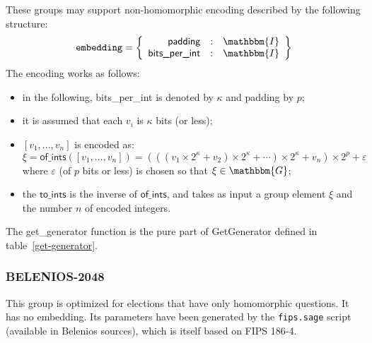 \documentclass[a4paper]{article}
\newcommand{\G}{\mathbbm{G}}
\newcommand{\I}{\mathbbm{I}}
\begin{document}
These groups may support non-homomorphic encoding described by the
following structure:
\begin{gather*}
  \texttt{embedding}=\left\{
    \begin{array}{rcl}
      \textsf{padding}&:&\I\\
      \textsf{bits\_per\_int}&:&\I
    \end{array}
  \right\}
\end{gather*}
The encoding works as follows:
\begin{itemize}
\item in the following, \textsf{bits\_per\_int} is denoted by $\kappa$
  and \textsf{padding} by $p$;
\item it is assumed that each $v_i$ is $\kappa$ bits (or less);
\item $[v_1,\dots,v_n]$ is encoded as:
  \[
    \xi=\textsf{of\_ints}([v_1,\dots,v_n])=(((v_1\times
    2^\kappa+v_2)\times 2^\kappa+\dotsb)\times 2^\kappa+v_n)\times
    2^p+\varepsilon
  \]
  where $\varepsilon$ (of $p$ bits or less) is chosen so that $\xi\in\G$;
\item the $\textsf{to\_ints}$ is the inverse of $\textsf{of\_ints}$, and
  takes as input a group element $\xi$ and the number $n$ of encoded
  integers.
\end{itemize}
The \textsf{get\_generator} function is the pure part of
\textsf{GetGenerator} defined in table~\ref{get-generator}.

\subsubsection{BELENIOS-2048}
\label{h-group}

This group is optimized for elections that have only homomorphic
questions. It has no \textsf{embedding}. Its parameters have been
generated by the \verb=fips.sage= script (available in Belenios
sources), which is itself based on FIPS 186-4.
\end{document}
